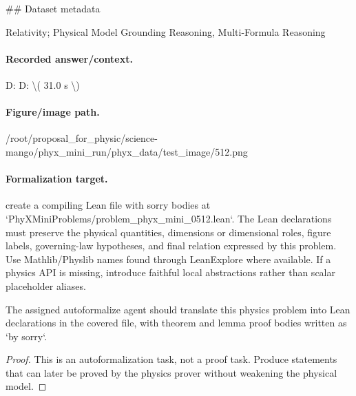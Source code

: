 \#\# Dataset metadata

Relativity; Physical Model Grounding Reasoning, Multi-Formula Reasoning

\paragraph{Recorded answer/context.}
D: D: \textbackslash{}( 31.0 s \textbackslash{})

\paragraph{Figure/image path.}
/root/proposal\_for\_physic/science-mango/phyx\_mini\_run/phyx\_data/test\_image/512.png

\paragraph{Formalization target.}
create a compiling Lean file with sorry bodies at `PhyXMiniProblems/problem\_phyx\_mini\_0512.lean`. The Lean declarations must preserve the physical quantities, dimensions or dimensional roles, figure labels, governing-law hypotheses, and final relation expressed by this problem.
Use Mathlib/Physlib names found through LeanExplore where available. If a physics API is missing, introduce faithful local abstractions rather than scalar placeholder aliases.

\begin{theorem}
\label{thm:physics:phyx_mini_0512:target}
The assigned autoformalize agent should translate this physics problem into Lean declarations in the covered file, with theorem and lemma proof bodies written as `by sorry`.
\end{theorem}
\begin{proof}
This is an autoformalization task, not a proof task. Produce statements that can later be proved by the physics prover without weakening the physical model.
\end{proof}


